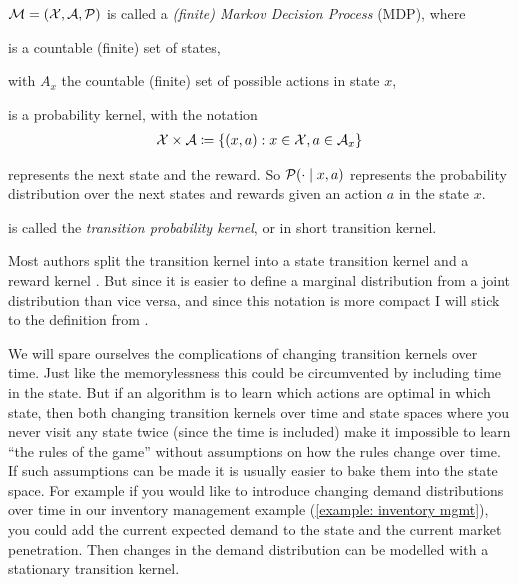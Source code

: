 \begin{definition}
	\(\mathcal{M}=(\mathcal{X},\mathcal{A},\mathcal{P}) \) is called a \emph{(finite) Markov Decision Process} (MDP), where
	\begin{description}[noitemsep]
		\item[\(\cX\)] is a countable (finite) set of states,
		\item[\(\cA=(\cA_x)_{x\in\cX}\)] with \(A_x\) the countable (finite) set of possible actions in state \(x\),
		\item[\(\cP\colon (\cX\times\cA) \times \sigma_{\cX\times\R} \to \R\)] is a probability kernel, with the notation 
		\begin{align}\label{notation: XxA}
			\mathcal{X}\times\mathcal{A}\coloneqq \{(x,a): x\in\mathcal{X}, a\in\mathcal{A}_x \} 
		\end{align}
		\item[\(\cX\times\R\)] represents the next state and the reward. So \(\mathcal{P}(\cdot\mid x,a) \) represents the probability distribution over the next states and rewards given an action \(a\) in the state \(x\).
		\item[\(\cP\)] is called the \emph{transition probability kernel}, or in short transition kernel.  
	\end{description}
\end{definition}
\begin{remark}\label{split state/reward transition kernel }
	Most authors split the transition kernel into a state transition kernel and a reward kernel \parencite[e.g.][]{putermanMarkovDecisionProcesses2005}. But since it is easier to define a marginal distribution from a joint distribution than vice versa, and since this notation is more compact I will stick to the definition from \textcite{szepesvariAlgorithmsReinforcementLearning2010}. 
	
	We will spare ourselves the complications of changing transition kernels over time. Just like the memorylessness this could be circumvented by including time in the state. But if an algorithm is to learn which actions are optimal in which state, then both changing transition kernels over time and state spaces where you never visit any state twice (since the time is included) make it impossible to learn ``the rules of the game'' without assumptions on how the rules change over time. If such assumptions can be made it is usually easier to bake them into the state space. For example if you would like to introduce changing demand distributions over time in our inventory management example (\ref{example: inventory mgmt}), you could add the current expected demand to the state and the current market penetration. Then changes in the demand distribution can be modelled with a stationary transition kernel. 
\end{remark}

